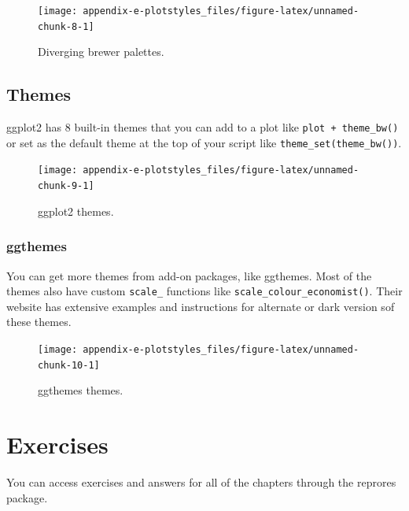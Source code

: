 \documentclass[
  oneside]{book}
\begin{document}
\begin{figure}

{\centering \texttt{[image: appendix-e-plotstyles\_files/figure-latex/unnamed-chunk-8-1]} 

}

\caption{Diverging brewer palettes.}\label{fig:unnamed-chunk-8}
\end{figure}

\hypertarget{themes-1}{%
\section{Themes}\label{themes-1}}

ggplot2 has 8 built-in themes that you can add to a plot like \texttt{plot\ +\ theme\_bw()} or set as the default theme at the top of your script like \texttt{theme\_set(theme\_bw())}.

\begin{figure}

{\centering \texttt{[image: appendix-e-plotstyles\_files/figure-latex/unnamed-chunk-9-1]} 

}

\caption{{ggplot2} themes.}\label{fig:unnamed-chunk-9}
\end{figure}

\hypertarget{ggthemes}{%
\subsection{ggthemes}\label{ggthemes}}

You can get more themes from add-on packages, like ggthemes. Most of the themes also have custom \texttt{scale\_} functions like \texttt{scale\_colour\_economist()}. Their website has extensive examples and instructions for alternate or dark version sof these themes.

\begin{figure}

{\centering \texttt{[image: appendix-e-plotstyles\_files/figure-latex/unnamed-chunk-10-1]} 

}

\caption{{ggthemes} themes.}\label{fig:unnamed-chunk-10}
\end{figure}

\hypertarget{exercises}{%
\chapter{Exercises}\label{exercises}}

You can access exercises and answers for all of the chapters through the reprores package.
\end{document}
